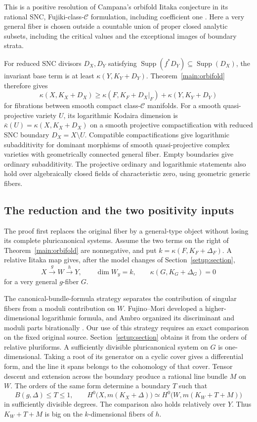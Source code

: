 This is a positive resolution of Campana's orbifold Iitaka
conjecture in its rational SNC, Fujiki-class-$\mathcal C$
formulation, including coefficient one
\cite[Conjecture~6.1 and Remark~6.2]{CampanaOrbifolds}.
Here a very general fiber is chosen outside a countable union of
proper closed analytic subsets, including the critical values and
the exceptional images of boundary strata.

For reduced SNC divisors $D_X,D_Y$ satisfying
$\operatorname{Supp}(f^*D_Y)\subseteq\operatorname{Supp}(D_X)$,
the invariant base term is at least $\kappa(Y,K_Y+D_Y)$.
Theorem~\ref{main:orbifold} therefore gives
\[
 \kappa(X,K_X+D_X)
 \geq\kappa(F,K_F+D_X|_F)+\kappa(Y,K_Y+D_Y)
\]
for fibrations between smooth compact class-$\mathcal C$ manifolds.
For a smooth quasi-projective variety $U$, its logarithmic Kodaira
dimension is $\bar\kappa(U)=\kappa(X,K_X+D_X)$ on a smooth
projective compactification with reduced SNC boundary
$D_X=X\setminus U$. Compatible compactifications give logarithmic
subadditivity for dominant morphisms of smooth quasi-projective
complex varieties with geometrically connected general fiber.
Empty boundaries give ordinary subadditivity. The projective
ordinary and logarithmic statements also hold over algebraically
closed fields of characteristic zero, using geometric generic fibers.

\subsection{The reduction and the two positivity inputs}

The proof first replaces the original fiber by a general-type
object without losing its complete pluricanonical systems.
Assume the two terms on the right of Theorem~\ref{main:orbifold}
are nonnegative, and put $k=\kappa(F,K_F+\Delta_F)$.
A relative Iitaka map gives, after the model changes of Section~\ref{setup:section},
\[
 X\xrightarrow{g}W\xrightarrow{h}Y,
 \qquad \dim W_y=k,
 \qquad\kappa(G,K_G+\Delta_G)=0
\]
for a very general $g$-fiber $G$.

The canonical-bundle-formula strategy separates the contribution
of singular fibers from a moduli contribution on $W$.
Fujino--Mori developed a higher-dimensional logarithmic formula,
and Ambro organized its discriminant and moduli parts birationally
\cite{FujinoMori,AmbroBoundary,AmbroModuli}.
Our use of this strategy requires an exact comparison on the fixed
original source. Section~\ref{setup:section} obtains it from the orders of relative
pluriforms. A sufficiently divisible pluricanonical system on $G$
is one-dimensional. Taking a root of its generator on a cyclic
cover gives a differential form, and the line it spans belongs to
the cohomology of that cover. Tensor descent and extension across
the boundary produce a rational line bundle $M$ on $W$.
The orders of the same form determine a boundary $T$ such that
\[
 B(g,\Delta)\leq T\leq1,
 \qquad
 H^0\bigl(X,m(K_X+\Delta)\bigr)
 \simeq H^0\bigl(W,m(K_W+T+M)\bigr)
\]
in sufficiently divisible degrees. The comparison also holds
relatively over $Y$. Thus $K_W+T+M$ is big on the
$k$-dimensional fibers of $h$.

